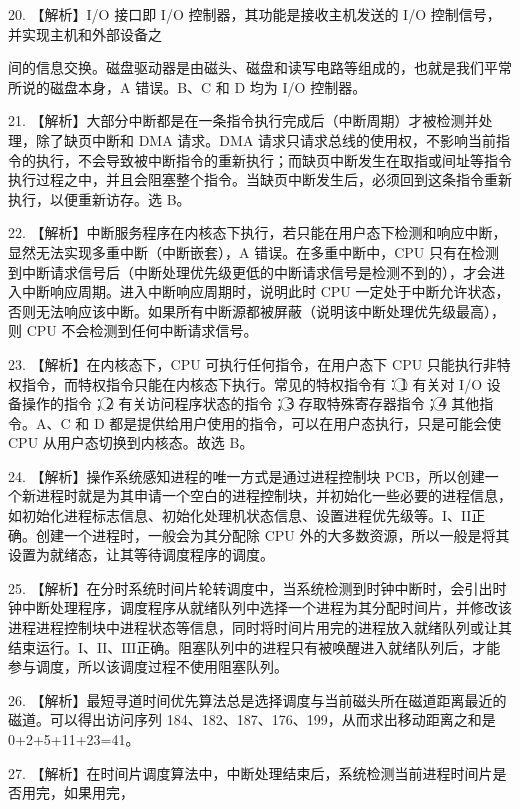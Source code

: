 \documentclass[UTF8,11pt]{ctexart}
\begin{document}
20. 【解析】I/O 接口即 I/O 控制器，其功能是接收主机发送的 I/O 控制信号，并实现主机和外部设备之


间的信息交换。磁盘驱动器是由磁头、磁盘和读写电路等组成的，也就是我们平常所说的磁盘本身，A 错误。B、C 和 D 均为 I/O 控制器。


21. 【解析】大部分中断都是在一条指令执行完成后（中断周期）才被检测并处理，除了缺页中断和 DMA 请求。DMA 请求只请求总线的使用权，不影响当前指令的执行，不会导致被中断指令的重新执行；而缺页中断发生在取指或间址等指令执行过程之中，并且会阻塞整个指令。当缺页中断发生后，必须回到这条指令重新执行，以便重新访存。选 B。


22. 【解析】中断服务程序在内核态下执行，若只能在用户态下检测和响应中断，显然无法实现多重中断（中断嵌套），A 错误。在多重中断中，CPU 只有在检测到中断请求信号后（中断处理优先级更低的中断请求信号是检测不到的），才会进入中断响应周期。进入中断响应周期时，说明此时 CPU 一定处于中断允许状态，否则无法响应该中断。如果所有中断源都被屏蔽（说明该中断处理优先级最高），则 CPU 不会检测到任何中断请求信号。


23. 【解析】在内核态下，CPU 可执行任何指令，在用户态下 CPU 只能执行非特权指令，而特权指令只能在内核态下执行。常见的特权指令有：\textcircled{1} 有关对 I/O 设备操作的指令；\textcircled{2} 有关访问程序状态的指令；\textcircled{3} 存取特殊寄存器指令；\textcircled{4} 其他指令。A、C 和 D 都是提供给用户使用的指令，可以在用户态执行，只是可能会使 CPU 从用户态切换到内核态。故选 B。


24. 【解析】操作系统感知进程的唯一方式是通过进程控制块 PCB，所以创建一个新进程时就是为其申请一个空白的进程控制块，并初始化一些必要的进程信息，如初始化进程标志信息、初始化处理机状态信息、设置进程优先级等。\(\displaystyle \mathrm{I}\)、\(\displaystyle \mathrm{II}\)正确。创建一个进程时，一般会为其分配除 CPU 外的大多数资源，所以一般是将其设置为就绪态，让其等待调度程序的调度。


25. 【解析】在分时系统时间片轮转调度中，当系统检测到时钟中断时，会引出时钟中断处理程序，调度程序从就绪队列中选择一个进程为其分配时间片，并修改该进程进程控制块中进程状态等信息，同时将时间片用完的进程放入就绪队列或让其结束运行。\(\displaystyle \mathrm{I}\)、\(\displaystyle \mathrm{II}\)、\(\displaystyle \mathrm{III}\)正确。阻塞队列中的进程只有被唤醒进入就绪队列后，才能参与调度，所以该调度过程不使用阻塞队列。


26. 【解析】最短寻道时间优先算法总是选择调度与当前磁头所在磁道距离最近的磁道。可以得出访问序列 184、182、187、176、199，从而求出移动距离之和是 0+2+5+11+23=41。


27. 【解析】在时间片调度算法中，中断处理结束后，系统检测当前进程时间片是否用完，如果用完，
\end{document}

